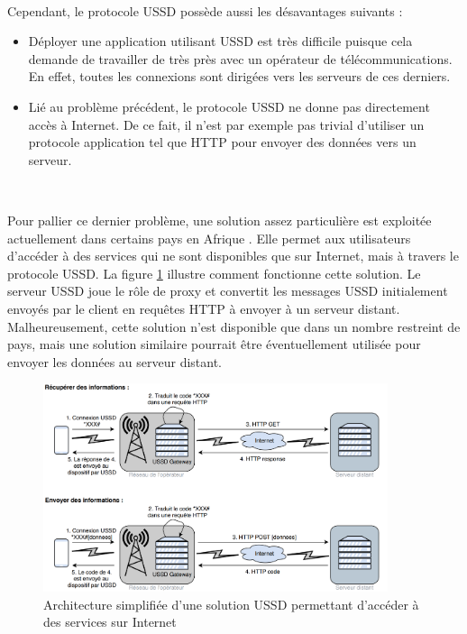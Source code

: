 ~

\noindent
Cependant, le protocole USSD possède aussi les désavantages suivants :

\begin{itemize}
  \item Déployer une application utilisant USSD est très difficile puisque cela demande de travailler de très près avec un opérateur de télécommunications. En effet, toutes les connexions sont dirigées vers les serveurs de ces derniers. \cite{perrier2015ussd}

  \item Lié au problème précédent, le protocole USSD ne donne pas directement accès à Internet. De ce fait, il n'est par exemple pas trivial d'utiliser un protocole application tel que HTTP pour envoyer des données vers un serveur.
\end{itemize}

~

\noindent
Pour pallier ce dernier problème, une solution assez particulière est exploitée actuellement dans certains pays en Afrique \cite{africa_ussd}. Elle permet aux utilisateurs d'accéder à des services qui ne sont disponibles que sur Internet, mais à travers le protocole USSD. La figure \ref{fig:ussdex} illustre comment fonctionne cette solution. Le serveur USSD joue le rôle de proxy et convertit les messages USSD initialement envoyés par le client en requêtes HTTP à envoyer à un serveur distant. Malheureusement, cette solution n'est disponible que dans un nombre restreint de pays, mais une solution similaire pourrait être éventuellement utilisée pour envoyer les données au serveur distant.

\begin{figure}[ht!]
  \centering
  \includegraphics[width=0.90\textwidth]{img/el_prototype/ussd_examples.png}
  \caption{Architecture simplifiée d'une solution USSD permettant d'accéder à des services sur Internet}
  \label{fig:ussdex}
\end{figure}

